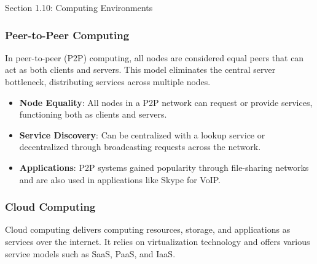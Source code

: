 \begin{notes}{Section 1.10: Computing Environments}
\begin{highlight}
    \end{highlight}
    
    \subsubsection*{Peer-to-Peer Computing}
    
    In peer-to-peer (P2P) computing, all nodes are considered equal peers that can act as both clients and servers. This model eliminates the central server bottleneck, distributing services across 
    multiple nodes.
    
    \begin{highlight}
    
    \begin{itemize}
        \item \textbf{Node Equality}: All nodes in a P2P network can request or provide services, functioning both as clients and servers.
        \item \textbf{Service Discovery}: Can be centralized with a lookup service or decentralized through broadcasting requests across the network.
        \item \textbf{Applications}: P2P systems gained popularity through file-sharing networks and are also used in applications like Skype for VoIP.
    \end{itemize}
    
    \end{highlight}
    
    \subsubsection*{Cloud Computing}
    
    Cloud computing delivers computing resources, storage, and applications as services over the internet. It relies on virtualization technology and offers various service models such as SaaS, PaaS, and IaaS.
    
    \begin{highlight}
    

\end{highlight}
\end{notes}
